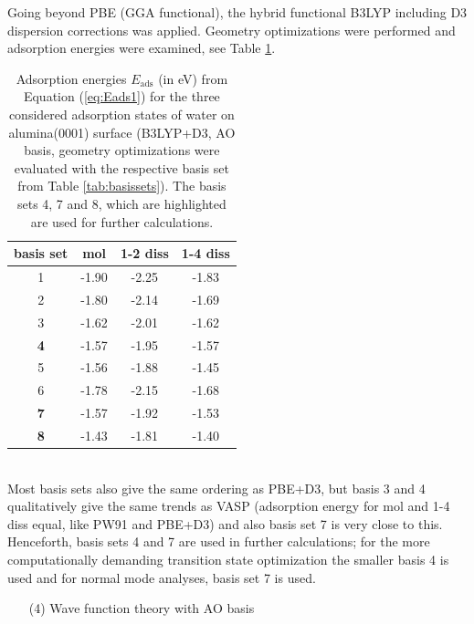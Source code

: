 \documentclass[11pt,DIV=13,BCOR=5mm,a4paper,headinclude]{scrbook}
\begin{document}
Going beyond PBE (GGA functional), the hybrid functional B3LYP including D3 dispersion corrections was applied.
Geometry optimizations were performed and adsorption energies were examined, see Table \ref{tab:basisset-results-B3LYP+D3}.
 \begin{table}[!h]
  \centering
   \caption{Adsorption energies $E_\textrm{ads}$ (in eV) from Equation (\ref{eq:Eads1}) for the three considered adsorption states of water on alumina(0001) surface (B3LYP+D3, AO basis, geometry optimizations were evaluated with the respective basis set from Table \ref{tab:basissets}).
   The basis sets 4, 7 and 8, which are highlighted are used for further calculations.}
  \begin{tabular}{c|ccc}
  \toprule
  basis set & mol & 1-2 diss & 1-4 diss \\\midrule
  1 &-1.90 &-2.25 &-1.83 \\
  2 &-1.80 &-2.14 &-1.69 \\
  3 &-1.62 &-2.01 &-1.62 \\
  \textbf{4} &-1.57 &-1.95 &-1.57 \\
  5 &-1.56 &-1.88 &-1.45 \\
  6 &-1.78 &-2.15 &-1.68 \\
  \textbf{7} &-1.57 &-1.92 &-1.53 \\
  \textbf{8} &-1.43 &-1.81 &-1.40 \\\bottomrule
  \end{tabular}
  \label{tab:basisset-results-B3LYP+D3}
\end{table}
\\
Most basis sets also give the same ordering as PBE+D3, but basis 3 and 4 qualitatively give the same trends as VASP (adsorption energy for mol and 1-4 diss equal, like PW91 and PBE+D3) and also basis set 7 is very close to this.
Henceforth, basis sets 4 and 7 are used in further calculations; for the more computationally demanding transition state optimization the smaller basis 4 is used and for normal mode analyses, basis set 7 is used.



% 

\begin{enumerate}
 \item[(4)] Wave function theory with AO basis
\end{enumerate}
\end{document}
